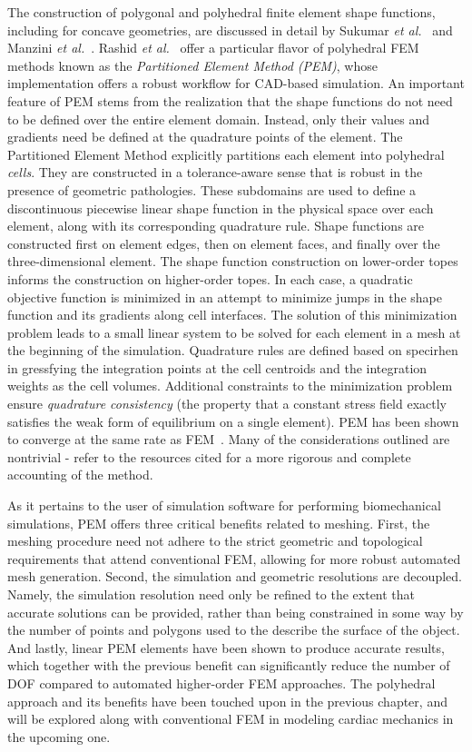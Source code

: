 The construction of polygonal and polyhedral finite element shape functions, including for concave geometries, are discussed in detail by Sukumar \textit{et al.}~\cite{sukumar_2006} and Manzini \textit{et al.}~\cite{manzini_2014}. Rashid \textit{et al.}~\cite{rashid_2012, rashid_2015} offer a particular flavor of polyhedral FEM methods known as the \textit{Partitioned Element Method (PEM)}, whose implementation offers a robust workflow for CAD-based simulation. An important feature of PEM stems from the realization that the shape functions do not need to be defined over the entire element domain. Instead, only their values and gradients need be defined at the quadrature points of the element. The Partitioned Element Method explicitly partitions each element into polyhedral \textit{cells}. They are constructed in a tolerance-aware sense that is robust in the presence of geometric pathologies. These subdomains are used to define a discontinuous piecewise linear shape function in the physical space over each element, along with its corresponding quadrature rule. Shape functions are constructed first on element edges, then on element faces, and finally over the three-dimensional element. The shape function construction on lower-order topes informs the construction on higher-order topes. In each case, a quadratic objective function is minimized in an attempt to minimize jumps in the shape function and its gradients along cell interfaces. The solution of this minimization problem leads to a small linear system to be solved for each element in a mesh at the beginning of the simulation. Quadrature rules are defined based on specirhen in gressfying the integration points at the cell centroids and the integration weights as the cell volumes. Additional constraints to the minimization problem ensure \textit{quadrature consistency} (the property that a constant stress field exactly satisfies the weak form of equilibrium on a single element). PEM has been shown to converge at the same rate as FEM~\cite{rashid_2012}. Many of the considerations outlined are nontrivial - refer to the resources cited for a more rigorous and complete accounting of the method.

As it pertains to the user of simulation software for performing biomechanical simulations, PEM offers three critical benefits related to meshing. First, the meshing procedure need not adhere to the strict geometric and topological requirements that attend conventional FEM, allowing for more robust automated mesh generation. Second, the simulation and geometric resolutions are decoupled. Namely, the simulation resolution need only be refined to the extent that accurate solutions can be provided, rather than being constrained in some way by the number of points and polygons used to the describe the surface of the object. And lastly, linear PEM elements have been shown to produce accurate results, which together with the previous benefit can significantly reduce the number of DOF compared to automated higher-order FEM approaches. The polyhedral approach and its benefits have been touched upon in the previous chapter, and will be explored along with conventional FEM in modeling cardiac mechanics in the upcoming one.

